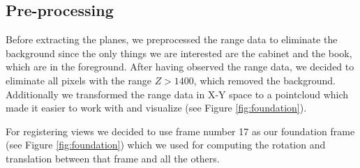 \subsection{Pre-processing}
Before extracting the planes, we preprocessed the range data to eliminate the background since the only things we are interested are the cabinet and the book, which are in the foreground. After having observed the range data, we decided to eliminate all pixels with the range $Z > 1400$, which removed the background. Additionally we transformed the range data in X-Y space to a pointcloud which made it easier to work with and visualize (see Figure \ref{fig:foundation}).

For registering views we decided to use frame number 17 as our foundation frame (see Figure \ref{fig:foundation}) which we used for computing the rotation and translation between that frame and all the others.

